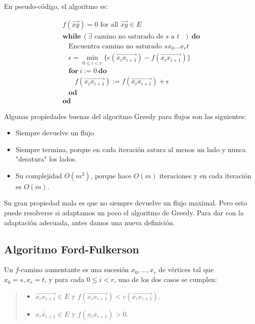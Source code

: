 \documentclass[a4paper, 12pt]{article}
\begin{document}
En pseudo-código, el algoritmo es:


\begin{align*}
    &f(\overrightarrow{xy}) = 0 \text{ for all $\overrightarrow{xy} \in E$ } \\ 
    &\textbf{while} ~ (\exists \text{ camino no saturado de $s$ a $t$ })
    ~\textbf{do}\\
    & ~ ~ ~ ~ \text{Encuentra camino no saturado $sx_0 \ldots x_{r} t$}\\
    &~ ~ ~ ~ \epsilon = \min_{0 \leq i < r} \Big\{ c(\overrightarrow{x_i x_{i+1}}) -
    f(\overrightarrow{x_i x_{i+1}})\Big\}\\
    &~ ~ ~ ~ \textbf{for} ~ i := 0 ~ \textbf{do}\\ 
    &~ ~ ~ ~  ~ ~ ~ ~  f(\overrightarrow{x_i x_{i+1}}) := f(\overrightarrow{x_i x_{i+1}}) + \epsilon \\
    &~ ~ ~ ~ \textbf{od} \\ 
    &\textbf{od}
\end{align*}

Algunas propiedades buenas del algoritmo Greedy para flujos son las siguientes:

\begin{itemize}
    \item Siempre devuelve un flujo 
    \item Siempre termina, porque en cada iteración satura al menos un lado y
        nunca "desatura" los lados.
    \item Su complejidad $O(m^2)$, porque hace $O(m)$ iteraciones y en cada
        iteración es $O(m)$.
\end{itemize}

Su gran propiedad mala es que no siempre devuelve un flujo maximal. Pero esto
puede resolverse si adaptamos un poco el algoritmo de Greedy. Para dar con la
adaptación adecuada, antes damos una nueva definición. 

\subsection{Algoritmo Ford-Fulkerson}

\begin{definition}
    Un $f$-camino aumentante es una sucesión $x_0, \ldots, x_r$ de vértices tal que
    $x_0 = s, x_r = t$, y para cada $0 \leq i < r$, uno de los dos casos se
    cumplen: 

    \begin{quote}
        
        \begin{itemize}
        \item $\overrightarrow{x_i x_{i+1}} \in E$ y
        $f(\overrightarrow{x_ix_{i+1}}) < c(\overrightarrow{x_ix_{i+1}})$.
    \item $\overleftarrow{x_{i}x_{i+1}} \in E$ y
            $f(\overleftarrow{x_{i}x_{i+1}}) > 0$.
        \end{itemize}
    \end{quote}


\end{definition}
    
\end{document}
